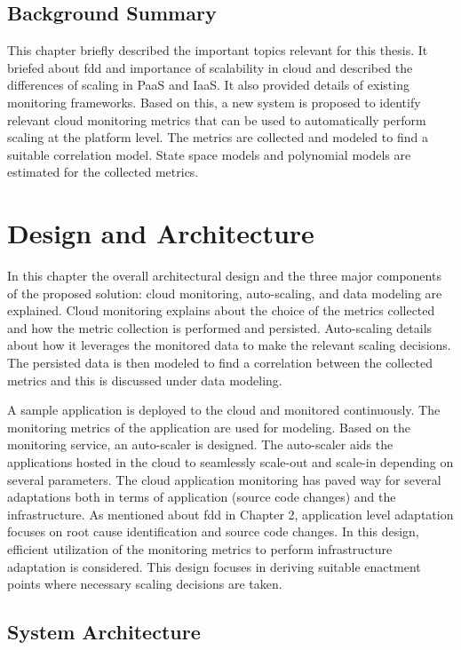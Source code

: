 \documentclass[article,type=msc,colorback,12pt,accentcolor=tud8b,table]{tudthesis}
\begin{document}
\subsection{Background Summary}
This chapter briefly described the important topics relevant for this thesis. It briefed about \gls{fdd} and importance of scalability in cloud and described the differences of scaling in PaaS and IaaS. It also provided details of existing monitoring frameworks. Based on this, a new system is proposed to identify relevant cloud monitoring metrics that can be used to automatically perform scaling at the platform level. The metrics are collected and modeled to find a suitable correlation model. State space models and polynomial models are estimated for the collected metrics.
	
 \cleardoublepage

 \hfill 
 \section{Design and Architecture}	
 \hfill \break
 
 In this chapter the overall architectural design and the three major components of the proposed solution: cloud monitoring, auto-scaling, and data modeling are explained. Cloud monitoring explains about the choice of the metrics collected and how the metric collection is performed and persisted. Auto-scaling details about how it leverages the monitored data to make the relevant scaling decisions. The persisted data is then modeled to find a correlation between the collected metrics and this is discussed under data modeling. 
 
 	A sample application is deployed to the cloud and monitored continuously. The monitoring metrics of the application are used for modeling. Based on the monitoring service, an auto-scaler is designed. The auto-scaler aids the applications hosted in the cloud to seamlessly scale-out and scale-in depending on several parameters. The cloud application monitoring has paved way for several adaptations both in terms of application (source code changes) and the infrastructure. As mentioned about \gls{fdd}  in Chapter 2, application level adaptation focuses on root cause identification and source code changes. In this design, efficient utilization of the monitoring metrics to perform infrastructure adaptation is considered.  This design focuses in deriving suitable enactment points where necessary scaling decisions are taken. 
 
\subsection{System Architecture} 
\end{document}
